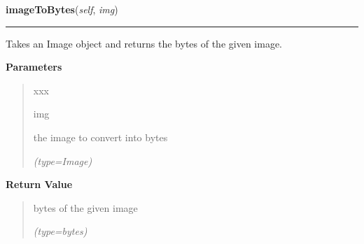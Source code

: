 \hspace{.8\funcindent}\begin{boxedminipage}{\funcwidth}

    \raggedright \textbf{imageToBytes}(\textit{self}, \textit{img})

    \vspace{-1.5ex}

    \rule{\textwidth}{0.5\fboxrule}
\setlength{\parskip}{2ex}
    Takes an Image object and returns the bytes of the given image.

\setlength{\parskip}{1ex}
      \textbf{Parameters}
      \vspace{-1ex}

      \begin{quote}
        \begin{Ventry}{xxx}

          \item[img]

          the image to convert into bytes

            {\it (type=Image)}

        \end{Ventry}

      \end{quote}

      \textbf{Return Value}
    \vspace{-1ex}

      \begin{quote}
      bytes of the given image

      {\it (type=bytes)}

      \end{quote}

    \end{boxedminipage}

    \label{client_rest:ImagingInterface:postCroppedImage}

    \vspace{0.5ex}

